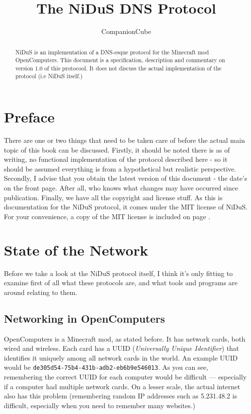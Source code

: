 \documentclass[]{report}
\title{The NiDuS DNS Protocol}
\author{CompanionCube}
\begin{document}
\maketitle

\begin{abstract}
NiDuS is an implementation of a DNS-esque protocol for the Minecraft mod OpenComputers. This document is a specification, description and commentary on version 1.0 of this protocool. It does not discuss the actual implementation of the protocol (i.e NiDuS itself.)
\end{abstract}
\tableofcontents
\chapter*{Preface}
There are one or two things that need to be taken care of before the actual main topic of this book can be discussed. Firstly, it should be noted there is as of writing, no functional implementation of the protocol described here - so it should be assumed everything is from a hypothetical but realistic perspective. Secondly, I advise that you obtain the latest version of this document - the date's on the front page. After all, who knows what changes may have occurred since publication. Finally, we have all the copyright and license stuff. As this is documentation for the NiDuS protocol, it comes under the MIT license of NiDuS. For your convenience, a copy of the MIT license is included on page \pageref{mit}.
\chapter{State of the Network}
Before we take a look at the NiDuS protocol itself, I think it's only fitting to examine first of all what these protocols are, and what tools and programs are around relating to them.
\section{Networking in OpenComputers}
OpenComputers is a Minecraft mod, as stated before. It has network cards, both wired and wireless. Each card has a UUID (\textit{Universally Unique Identifier}) that identifies it uniquely among all network cards in the world. An example UUID would be \texttt{de305d54-75b4-431b-adb2-eb6b9e546013}. As you can see, remembering the correct UUID for each computer would be difficult --- especially if a computer had multiple network cards. On a lesser scale, the actual internet also has this problem (remembering random IP addresses such as 5.231.48.2 is difficult, especially when you need to remember many websites.)
\end{document}
